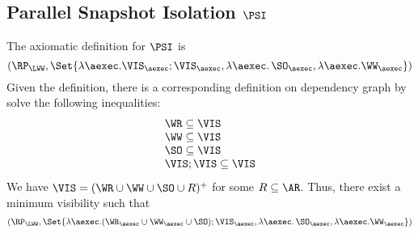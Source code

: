 \subsection{Parallel Snapshot Isolation \(\PSI\)}
\label{sec:sound-complete-psi}

The axiomatic definition for \( \PSI \) is 
\[ 
    (\RP_{\LWW}, \Set{\lambda \aexec. \VIS_{\aexec} ; \VIS_{\aexec}, \lambda \aexec \ldotp \SO_\aexec, \lambda \aexec. \WW_\aexec })
\]
Given the definition, there is a corresponding definition on dependency graph by solve the following inequalities:
\[
    \begin{array}{@{}l@{}}
        \WR \subseteq \VIS \\
        \WW \subseteq \VIS \\
        \SO \subseteq \VIS \\
        \VIS ; \VIS \subseteq \VIS 
    \end{array}
\]
We have \( \VIS = (\WR \cup \WW \cup \SO \cup R)^{+} \) for some \( R \subseteq \AR \).
Thus, there exist a minimum visibility such that 
\[ 
    (\RP_{\LWW}, \Set{\lambda \aexec. (\WR_{\aexec} \cup \WW_{\aexec} \cup \SO ) ; \VIS_{\aexec}, \lambda \aexec \ldotp \SO_\aexec, \lambda \aexec. \WW_\aexec })
\]

